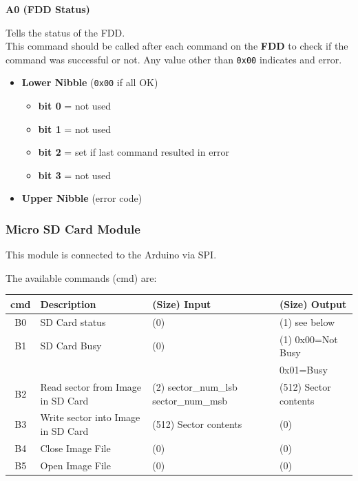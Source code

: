 \documentclass[a4paper,11pt]{article}
\begin{document}
     \textbf{A0 (FDD Status)}

     Tells the status of the FDD.\\

     This command should be called after each command on the \textbf{FDD} to
     check if the command was successful or not. Any value other than
     \texttt{0x00} indicates and error.

     \begin{itemize}
        \item \textbf{Lower Nibble} (\texttt{0x00} if all OK)
        \begin{itemize}
            \item \textbf{bit 0} = not used
            \item \textbf{bit 1} = not used
            \item \textbf{bit 2} = set if last command resulted in error
            \item \textbf{bit 3} = not used
        \end{itemize}
        \item \textbf{Upper Nibble} (error code)
    \end{itemize}

    \subsubsection{Micro SD Card Module}

    This module is connected to the Arduino via SPI.

    The available commands (cmd) are:

    \begin{tabular}{| c | m{3.8cm} | m{3cm} | m{3.5cm} | }
        \hline
        \rowcolor{lightgray}
        cmd & Description & (Size) Input & (Size) Output\\
        \hline
        B0 & SD Card status & (0) & (1) see below\\
        \hline
        B1 & SD Card Busy & (0) & (1) 0x00=Not Busy\\
           &              &     &     0x01=Busy\\
        \hline
        B2 & Read sector from Image in SD Card & (2) sector\_num\_lsb sector\_num\_msb & (512) Sector contents\\
        \hline
        B3 & Write sector into Image in SD Card & (512) Sector contents & (0) \\
        \hline
        B4 & Close Image File & (0) & (0)\\
        \hline
        B5 & Open Image File & (0) & (0)\\
        \hline
    \end{tabular}
\end{document}
